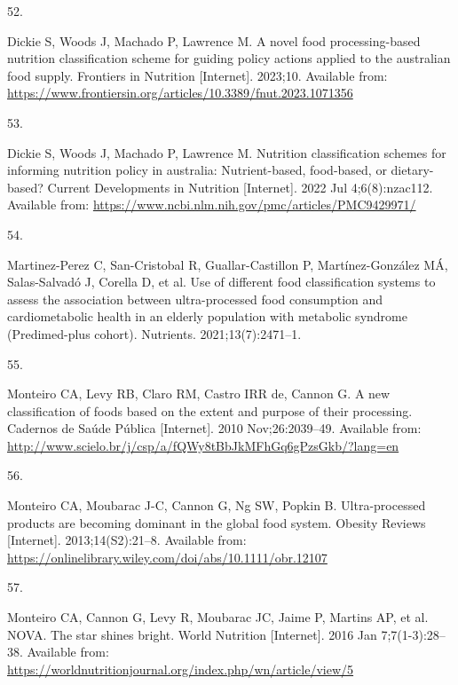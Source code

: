 \documentclass[
]{article}
\newlength{\cslhangindent}
\newlength{\csllabelwidth}
\newlength{\cslentryspacingunit} %
\newenvironment{CSLReferences}[2] %
 {%
  \setlength{\parindent}{0pt}
  \ifodd #1
  \let\oldpar\par
  \def\par{\hangindent=\cslhangindent\oldpar}
  \fi
  \setlength{\parskip}{#2\cslentryspacingunit}
 }%
 {}
\newcommand{\CSLLeftMargin}[1]{\parbox[t]{\csllabelwidth}{#1}}
\newcommand{\CSLRightInline}[1]{\parbox[t]{\linewidth - \csllabelwidth}{#1}\break}
\begin{document}
\begin{CSLReferences}{0}{0}
\leavevmode{}%
\CSLLeftMargin{52. }%
\CSLRightInline{Dickie S, Woods J, Machado P, Lawrence M. A novel food
processing-based nutrition classification scheme for guiding policy
actions applied to the australian food supply. Frontiers in Nutrition
{[}Internet{]}. 2023;10. Available from:
\url{https://www.frontiersin.org/articles/10.3389/fnut.2023.1071356}}

\leavevmode{}%
\CSLLeftMargin{53. }%
\CSLRightInline{Dickie S, Woods J, Machado P, Lawrence M. Nutrition
classification schemes for informing nutrition policy in australia:
Nutrient-based, food-based, or dietary-based? Current Developments in
Nutrition {[}Internet{]}. 2022 Jul 4;6(8):nzac112. Available from:
\url{https://www.ncbi.nlm.nih.gov/pmc/articles/PMC9429971/}}

\leavevmode{}%
\CSLLeftMargin{54. }%
\CSLRightInline{Martinez-Perez C, San-Cristobal R, Guallar-Castillon P,
Martínez-González MÁ, Salas-Salvadó J, Corella D, et al. Use of
different food classification systems to assess the association between
ultra-processed food consumption and cardiometabolic health in an
elderly population with metabolic syndrome (Predimed-plus cohort).
Nutrients. 2021;13(7):2471--1. }

\leavevmode{}%
\CSLLeftMargin{55. }%
\CSLRightInline{Monteiro CA, Levy RB, Claro RM, Castro IRR de, Cannon G.
A new classification of foods based on the extent and purpose of their
processing. Cadernos de Saúde Pública {[}Internet{]}. 2010
Nov;26:2039--49. Available from:
\url{http://www.scielo.br/j/csp/a/fQWy8tBbJkMFhGq6gPzsGkb/?lang=en}}

\leavevmode{}%
\CSLLeftMargin{56. }%
\CSLRightInline{Monteiro CA, Moubarac J-C, Cannon G, Ng SW, Popkin B.
Ultra-processed products are becoming dominant in the global food
system. Obesity Reviews {[}Internet{]}. 2013;14(S2):21--8. Available
from: \url{https://onlinelibrary.wiley.com/doi/abs/10.1111/obr.12107}}

\leavevmode{}%
\CSLLeftMargin{57. }%
\CSLRightInline{Monteiro CA, Cannon G, Levy R, Moubarac JC, Jaime P,
Martins AP, et al. NOVA. The star shines bright. World Nutrition
{[}Internet{]}. 2016 Jan 7;7(1-3):28--38. Available from:
\url{https://worldnutritionjournal.org/index.php/wn/article/view/5}}


\end{CSLReferences}
\end{document}
